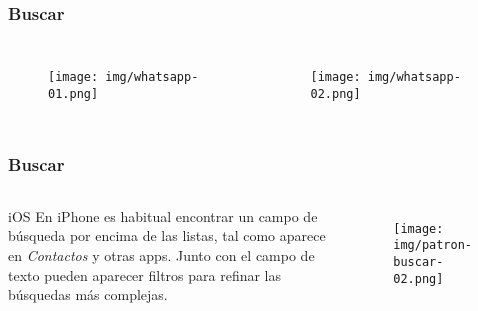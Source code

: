 \documentclass{beamer}
\begin{document}

\begin{frame}
\frametitle{Buscar}

\begin{columns}[c] %

\begin{figure}[H]
  \centering
  \texttt{[image: img/whatsapp-01.png]}
\end{figure}

\begin{figure}[H]
  \centering
  \texttt{[image: img/whatsapp-02.png]}
\end{figure}

\end{columns}
\end{frame}


\begin{frame}
\frametitle{Buscar}

\begin{columns}[c] %

\begin{block}{iOS}
\justify
En iPhone es habitual encontrar un campo de búsqueda por encima de las listas, tal como aparece en \textit{Contactos} y otras apps. Junto con el campo de texto pueden aparecer filtros para refinar las búsquedas más complejas.
\end{block}

\begin{figure}[H]
  \centering
  \texttt{[image: img/patron-buscar-02.png]}
\end{figure}
\end{columns}
\end{frame}

\end{document}

